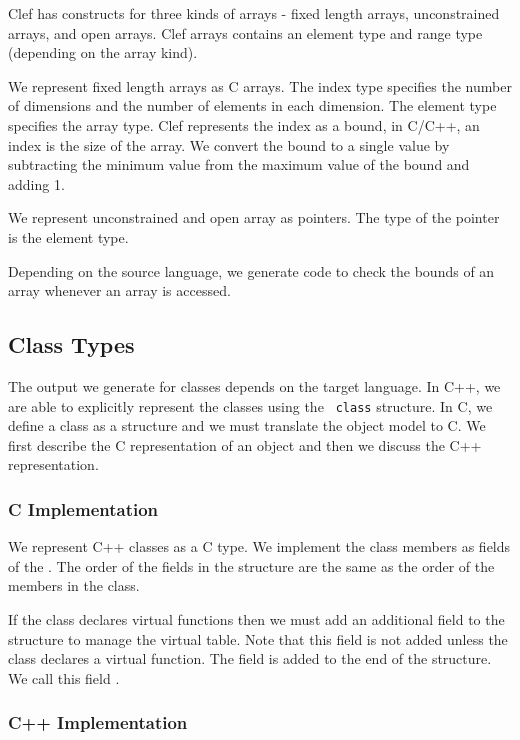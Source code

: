 Clef has constructs for three kinds of arrays - fixed length arrays,
unconstrained arrays, and open arrays.  Clef arrays contains
an element type and range type (depending on the array kind).

We represent fixed length arrays as C arrays.  The index type
specifies the number of dimensions and the number of elements in each
dimension.  The element type specifies the array type.  Clef
represents the index as a bound, in C/C++, an index is the size of the
array.  We convert the bound to a single value by subtracting the
minimum value from the maximum value of the bound and adding 1.

We represent unconstrained and open array as pointers.  The type of
the pointer is the element type.

Depending on the source language, we generate code to check the bounds
of an array whenever an array is accessed.  

\subsection{Class Types}

The output we generate for classes depends on the target language.  In
C++, we are able to explicitly represent the classes using the {\tt
class} structure.  In C, we define a class as a structure and we must
translate the object model to C.  We first describe the C
representation of an object and then we discuss the C++
representation.

\subsubsection{C Implementation}
We represent C++ classes as a C  type.  We implement the
class members as fields of the .  The order of the
fields in the structure are the same as the order of the members in
the class.

If the class declares virtual functions then we must add an additional
field to the structure to manage the virtual table.  Note that this
field is not added unless the class declares a virtual function.  The
field is added to the end of the structure.  We call this field
.  

\subsubsection{C++ Implementation}

